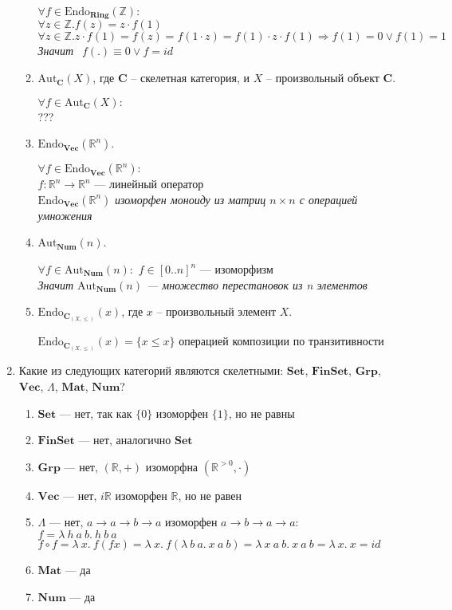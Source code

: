 \documentclass[draft]{article}
\newcommand{\cat}[1]{\mathbf{#1}}
\renewcommand{\C}{\cat{C}}
\newcommand{\Set}{\cat{Set}}
\newcommand{\FinSet}{\cat{FinSet}}
\newcommand{\Grp}{\cat{Grp}}
\renewcommand{\Vec}{\cat{Vec}}
\newcommand{\Mat}{\cat{Mat}}
\newcommand{\Num}{\cat{Num}}
\newcommand{\fs}[1]{\mathrm{#1}}
\begin{document}
\begin{enumerate}
\begin{enumerate}
$\forall f \in \fs{Endo}_\cat{Ring}(\mathbb{Z}):$\\
$\forall z\in\mathbb{Z}. f(z) = z\cdot f(1)$\\
$\forall z\in\mathbb{Z}. z\cdot f(1) = f(z) = f(1 \cdot z) = f(1)\cdot z\cdot f(1) \Rightarrow f(1) = 0 \lor f(1) = 1$\\
\textit{Значит} $~~f(.) \equiv 0 \lor f = id$

\item $\fs{Aut}_\C(X)$, где $\C$ -- скелетная категория, и $X$ -- произвольный объект $\C$.

$\forall f \in \fs{Aut}_\C(X):$\\ ???

\item $\fs{Endo}_\Vec(\mathbb{R}^n)$.

$\forall f \in \fs{Endo}_\Vec(\mathbb{R}^n):$\\
$f : \mathbb{R}^n \to \mathbb{R}^n$ --- линейный оператор\\
$\fs{Endo}_\Vec(\mathbb{R}^n)$ \textit{ изоморфен моноиду из матриц $n \times n$ с операцией умножения}

\item $\fs{Aut}_\Num(n)$.

$\forall f \in \fs{Aut}_\Num(n):$
$f \in [0 .. n]^n$ --- изоморфизм\\
\textit{Значит $\fs{Aut}_\Num(n)$ --- множество перестановок из n элементов}

\item $\fs{Endo}_{\C_{(X,\leq)}}(x)$, где $x$ -- произвольный элемент $X$.

$\fs{Endo}_{\C_{(X,\leq)}}(x) = \lbrace x \leq x \rbrace$ операцией композиции по транзитивности

\end{enumerate}

\item Какие из следующих категорий являются скелетными: $\Set$, $\FinSet$, $\Grp$, $\Vec$, $\Lambda$, $\Mat$, $\Num$?

\begin{enumerate}
\item $\Set$ --- нет, так как $\lbrace 0 \rbrace$ изоморфен $\lbrace 1 \rbrace$, но не равны
\item $\FinSet$ --- нет, аналогично $\Set$
\item $\Grp$ --- нет, $(\mathbb{R}, +)$ изоморфна $(\mathbb{R}^{> 0}, \cdot)$
\item $\Vec$ --- нет, $i\mathbb{R}$ изоморфен $\mathbb{R}$, но не равен
\item $\Lambda$ --- нет, $a \to a \to b \to a$ изоморфен $a \to b \to a \to a$:\\
$f = \lambda~h~a~b.~h~b~a$\\
$f \circ f = \lambda~x.~f(f x) = \lambda~x.~f(\lambda~b~a.~x~a~b)= \lambda~x~a~b.~x~a~b = \lambda~x.~x = id$
\item $\Mat$ --- да
\item $\Num$ --- да
\end{enumerate}


\end{enumerate}
\end{document}
